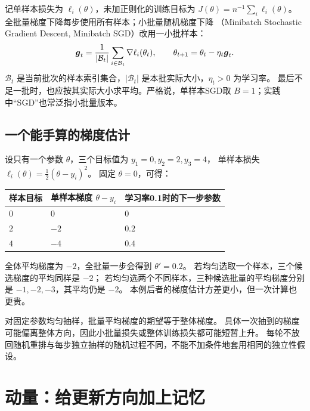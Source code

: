 记单样本损失为 $\ell_i(\theta)$，未加正则化的训练目标为
$J(\theta)=n^{-1}\sum_i\ell_i(\theta)$。
全批量梯度下降每步使用所有样本；小批量随机梯度下降
（Minibatch Stochastic Gradient Descent, Minibatch SGD）改用一小批样本：
\begin{equation}
 \boldsymbol{g}_t=\frac1{|\mathcal B_t|}\sum_{i\in\mathcal B_t}\nabla\ell_i(\theta_t),
 \qquad \theta_{t+1}=\theta_t-\eta_t\boldsymbol{g}_t.
 \label{eq:train-sgd}
\end{equation}
$\mathcal B_t$ 是当前批次的样本索引集合，$|\mathcal B_t|$ 是本批实际大小，$\eta_t>0$ 为学习率。
最后不足一批时，也应按其实际大小求平均。严格说，单样本SGD取 $B=1$；实践中“SGD”也常泛指小批量版本。

\subsection{一个能手算的梯度估计}
设只有一个参数 $\theta$，三个目标值为 $y_1=0,y_2=2,y_3=4$，
单样本损失 $\ell_i(\theta)=\tfrac12(\theta-y_i)^2$。
固定 $\theta=0$，可得：

\begin{center}
\small
\begin{tabularx}{.93\textwidth}{P{25mm}Y Y}
\toprule
样本目标 & 单样本梯度 $\theta-y_i$ & 学习率0.1时的下一步参数\\
\midrule
$0$ & $0$ & $0$\\
$2$ & $-2$ & $0.2$\\
$4$ & $-4$ & $0.4$\\
\bottomrule
\end{tabularx}
\end{center}

全体平均梯度为 $-2$，全批量一步会得到 $\theta'=0.2$。
若均匀选取一个样本，三个候选梯度的平均同样是 $-2$；
若均匀选两个不同样本，三种候选批量的平均梯度分别是 $-1,-2,-3$，其平均仍是 $-2$。
本例后者的梯度估计方差更小，但一次计算也更贵。

\begin{keyidea}[无偏估计与抽样波动]
对固定参数均匀抽样，批量平均梯度的期望等于整体梯度。
具体一次抽到的梯度可能偏离整体方向，因此小批量损失或整体训练损失都可能短暂上升。
每轮不放回随机重排与每步独立抽样的随机过程不同，不能不加条件地套用相同的独立性假设。
\end{keyidea}


\section{动量：给更新方向加上记忆}
\label{sec:train-momentum}

